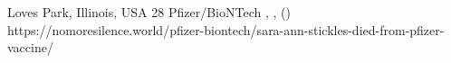           {
            Loves Park, Illinois, USA
          }
          {
            28
          }
          {
            Pfizer/BioNTech
          }
          {
          }
          {
            ,
            ,
             ()
          }
          {
            https://nomoresilence.world/pfizer-biontech/sara-ann-stickles-died-from-pfizer-vaccine/
          }


